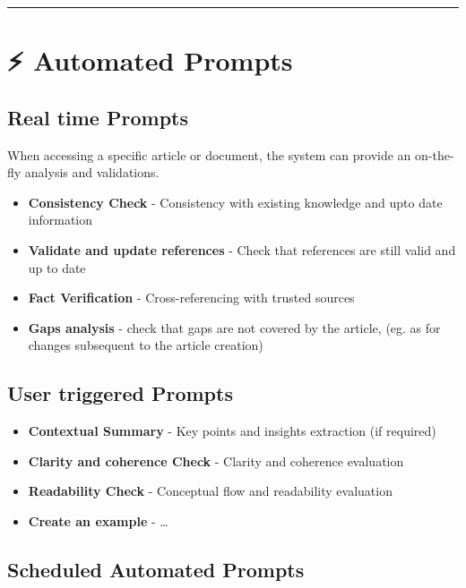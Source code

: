 \documentclass[
  letterpaper,
  DIV=11,
  numbers=noendperiod]{scrartcl}
\providecommand{\tightlist}{%
  \setlength{\itemsep}{0pt}\setlength{\parskip}{0pt}}\usepackage{longtable,booktabs,array}
\begin{document}
\begin{center}\rule{0.5\linewidth}{0.5pt}\end{center}

\section{⚡ Automated Prompts}\label{automated-prompts}

\subsection{Real time Prompts}\label{real-time-prompts}

When accessing a specific article or document, the system can provide an
on-the-fly analysis and validations.

\begin{itemize}
\tightlist
\item
  \textbf{Consistency Check} - Consistency with existing knowledge and
  upto date information
\item
  \textbf{Validate and update references} - Check that references are
  still valid and up to date
\item
  \textbf{Fact Verification} - Cross-referencing with trusted sources
\item
  \textbf{Gaps analysis} - check that gaps are not covered by the
  article, (eg. as for changes subsequent to the article creation)
\end{itemize}

\subsection{User triggered Prompts}\label{user-triggered-prompts}

\begin{itemize}
\tightlist
\item
  \textbf{Contextual Summary} - Key points and insights extraction (if
  required)
\item
  \textbf{Clarity and coherence Check} - Clarity and coherence
  evaluation
\item
  \textbf{Readability Check} - Conceptual flow and readability
  evaluation
\item
  \textbf{Create an example} - \ldots{}
\end{itemize}

\subsection{Scheduled Automated
Prompts}\label{scheduled-automated-prompts}
\end{document}
